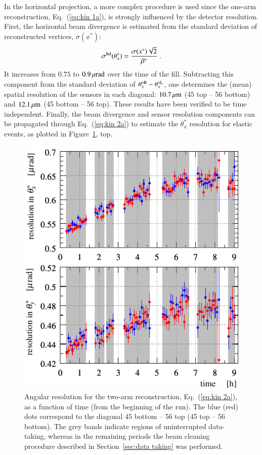 In the horizontal projection, a more complex procedure is used since the one-arm reconstruction, Eq.~(\ref{eq:kin 1a}), is strongly influenced by the detector resolution. First, the horizontal beam divergence is estimated from the standard deviation of reconstructed vertices, $\sigma(x^*)$:
\begin{equation}
\label{eq:beam div from vertex}
\sigma^{\rm bd}(\theta_x^*) = {\sigma(x^*) \sqrt 2\over \beta^*}\ .
\end{equation}
It increases from $0.75$ to $0.9\,{\rm \mu rad}$ over the time of the fill. Subtracting this component from the standard deviation of $\theta_x^{*\rm R} - \theta_x^{*\rm L}$, one determines the (mean) spatial resolution of the sensors in each diagonal: $10.7\,{\rm \mu m}$ (45 top -- 56 bottom) and $12.1\,{\rm \mu m}$ (45 bottom -- 56 top). These results have been verified to be time independent. Finally, the beam divergence and sensor resolution components can be propagated through Eq.~({\ref{eq:kin 2a}}) to estimate the $\theta_x^*$ resolution for elastic events, as plotted in Figure~\ref{fig:resol final}, top.

\begin{figure}
\begin{center}
\includegraphics{fig/resolutions_vs_time.pdf}
\caption{%
Angular resolution for the two-arm reconstruction, Eq.~(\ref{eq:kin 2a}), as a function of time (from the beginning of the run). The blue (red) dots correspond to the diagonal 45 bottom -- 56 top (45 top -- 56 bottom). The grey bands indicate regions of uninterrupted data-taking, whereas in the remaining periods the beam cleaning procedure described in Section~\ref{sec:data taking} was performed.
}
\label{fig:resol final}
\end{center}
\end{figure}

